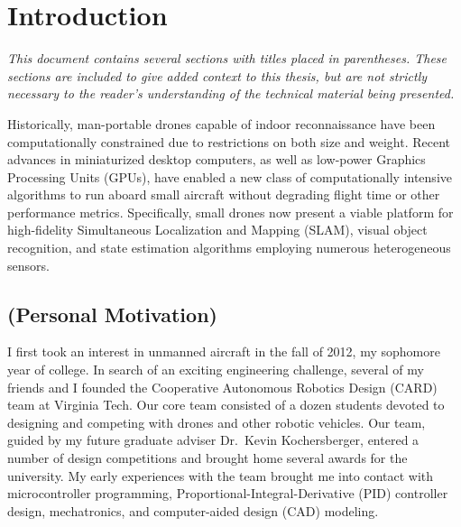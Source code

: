 \chapter{Introduction}


\textit{This document contains several sections with titles placed in parentheses. These sections are included to give added context to this thesis, but are not strictly necessary to the reader's understanding of the technical material being presented.}

Historically, man-portable drones capable of indoor reconnaissance have been computationally constrained due to restrictions on both size and weight. Recent advances in miniaturized desktop computers, as well as low-power Graphics Processing Units (GPUs), have enabled a new class of computationally intensive algorithms to run aboard small aircraft without degrading flight time or other performance metrics. Specifically, small drones now present a viable platform for high-fidelity Simultaneous Localization and Mapping (SLAM), visual object recognition, and state estimation algorithms employing numerous heterogeneous sensors.

\section{(Personal Motivation)}

I first took an interest in unmanned aircraft in the fall of 2012, my sophomore year of college. In search of an exciting engineering challenge, several of my friends and I founded the Cooperative Autonomous Robotics Design (CARD) team at Virginia Tech. Our core team consisted of a dozen students devoted to designing and competing with drones and other robotic vehicles. Our team, guided by my future graduate adviser Dr.~Kevin Kochersberger, entered a number of design competitions and brought home several awards for the university. My early experiences with the team brought me into contact with microcontroller programming, Proportional-Integral-Derivative (PID) controller design, mechatronics, and computer-aided design (CAD) modeling.

